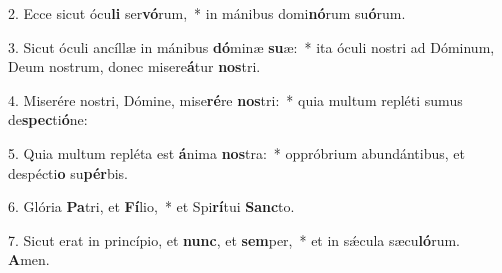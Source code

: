 2. Ecce sicut ócu\textbf{li} ser\textbf{vó}rum,~*  in mánibus domi\textbf{nó}rum su\textbf{ó}rum.\

3. Sicut óculi ancíllæ in mánibus \textbf{dó}minæ \textbf{su}æ:~*  ita óculi nostri ad Dóminum, Deum nostrum, donec misere\textbf{á}tur \textbf{nos}tri.\

4. Miserére nostri, Dómine, mise\textbf{ré}re \textbf{nos}tri:~*  quia multum repléti sumus de\textbf{spec}ti\textbf{ó}ne:\

5. Quia multum repléta est \textbf{á}nima \textbf{nos}tra:~*  oppróbrium abundántibus, et despécti\textbf{o} su\textbf{pér}bis.\

6. Glória \textbf{Pa}tri, et \textbf{Fí}lio,~*  et Spi\textbf{rí}tui \textbf{Sanc}to.\

7. Sicut erat in princípio, et \textbf{nunc}, et \textbf{sem}per,~*  et in sǽcula sæcu\textbf{ló}rum. \textbf{A}men.\

